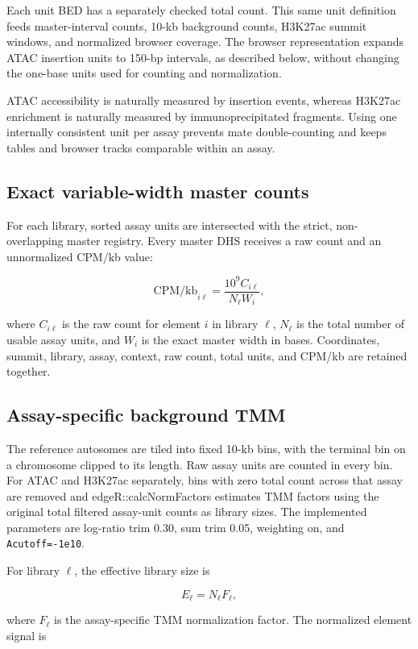 \documentclass[11pt]{article}
\newcommand{\software}[1]{\textsf{#1}}
\begin{document}
Each unit BED has a separately checked total count.  This same unit definition
feeds master-interval counts, 10-kb background counts, H3K27ac summit windows,
and normalized browser coverage.  The browser representation expands ATAC
insertion units to 150-bp intervals, as described below, without changing the
one-base units used for counting and normalization.

ATAC accessibility is naturally measured by insertion events, whereas
H3K27ac enrichment is naturally measured by immunoprecipitated fragments.
Using one internally consistent unit per assay prevents mate double-counting
and keeps tables and browser tracks comparable within an assay.

\subsection{Exact variable-width master counts}

For each library, sorted assay units are intersected with the strict,
non-overlapping master registry.  Every master DHS receives a raw count and an
unnormalized CPM/kb value:

\[
  \mathrm{CPM/kb}_{i\ell} =
  \frac{10^9 C_{i\ell}}{N_{\ell} W_i},
\]

where \(C_{i\ell}\) is the raw count for element \(i\) in library \(\ell\),
\(N_{\ell}\) is the total number of usable assay units, and \(W_i\) is the exact
master width in bases.  Coordinates, summit, library, assay, context, raw
count, total units, and CPM/kb are retained together.

\subsection{Assay-specific background TMM}

The reference autosomes are tiled into fixed 10-kb bins, with the terminal bin
on a chromosome clipped to its length.  Raw assay units are counted in every
bin.  For ATAC and H3K27ac separately, bins with zero total count across that
assay are removed and \software{edgeR::calcNormFactors} estimates TMM factors
using the original total filtered assay-unit counts as library sizes.  The
implemented parameters are log-ratio trim 0.30, sum trim 0.05, weighting on,
and \texttt{Acutoff=-1e10}.

For library \(\ell\), the effective library size is

\[
  E_{\ell}=N_{\ell}F_{\ell},
\]

where \(F_{\ell}\) is the assay-specific TMM normalization factor.  The
normalized element signal is
\end{document}
